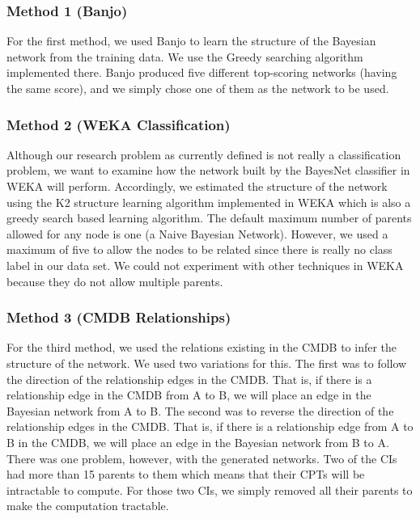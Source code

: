 \documentclass[10pt,twocolumn,letterpaper]{article}
\begin{document}
\subsubsection{Method 1 (Banjo)}
\label{sec:model1}

For the first method, we used Banjo to learn the structure of the Bayesian network from the training data. We use the Greedy searching algorithm implemented
there. Banjo produced five different top-scoring networks (having the same score), and we simply chose one of them as the network to be used.

\subsubsection{Method 2 (WEKA Classification)}

Although our research problem as currently defined is not really a classification problem, we want to examine how the network built by the BayesNet classifier
in WEKA will perform. Accordingly, we estimated the structure of the network using the K2 structure learning algorithm implemented in WEKA which is also a
greedy
search based learning algorithm. The default maximum number of parents allowed for any node is one (a Naive Bayesian Network). However, we used a maximum of
five to allow the nodes to be related since there is really no class label in our data set. We could not experiment with other techniques in WEKA because they
do not allow multiple parents.

\subsubsection{Method 3 (CMDB Relationships)}

For the third method, we used the relations existing in the CMDB to infer the structure of the network. We used two
variations for this. The first was to follow the direction of the relationship edges in the CMDB. That is, if there is a relationship edge in the CMDB from A to
B, we will place an
edge in the Bayesian network from A to B. The second was to reverse the direction of the relationship edges in the CMDB. That is,
if there is a relationship edge from A to B in the CMDB, we will place an edge in the Bayesian network from B to A. There was one problem, however, with
the generated networks. Two of the CIs had more than 15 parents to them which means that their CPTs will be intractable to compute. For those two CIs, we simply
removed all their parents to make the computation tractable.
\end{document}
